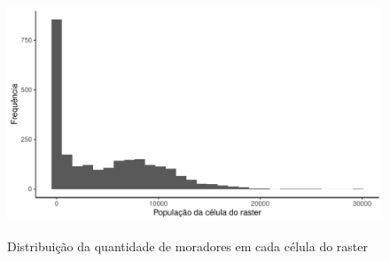 \begin{apendicesenv}
\clearpage

\begin{figure}[!h]
    \centering
    \caption{Distribuição da quantidade de moradores em cada célula do raster}
    \includegraphics[width = .85\linewidth]{figuras/populacao-distribuicao-raster.pdf}
    \label{fig:populacao-rasters}
\end{figure}






\end{apendicesenv}
    
    